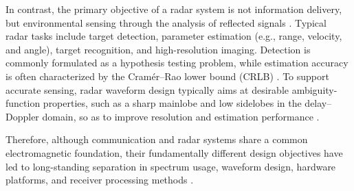 In contrast, the primary objective of a radar system is not information delivery, but environmental sensing through the analysis of reflected signals \cite{Skolnik2008,Richards2014}. Typical radar tasks include target detection, parameter estimation (e.g., range, velocity, and angle), target recognition, and high-resolution imaging. Detection is commonly formulated as a hypothesis testing problem, while estimation accuracy is often characterized by the Cramér--Rao lower bound (CRLB) \cite{Kay1993}. To support accurate sensing, radar waveform design typically aims at desirable ambiguity-function properties, such as a sharp mainlobe and low sidelobes in the delay--Doppler domain, so as to improve resolution and estimation performance \cite{Levanon2004,Richards2014}.

Therefore, although communication and radar systems share a common electromagnetic foundation, their fundamentally different design objectives have led to long-standing separation in spectrum usage, waveform design, hardware platforms, and receiver processing methods \cite{Liu2020JointRadarComm,Liu2022ISAC,Zhang2021ISAC6G}.


